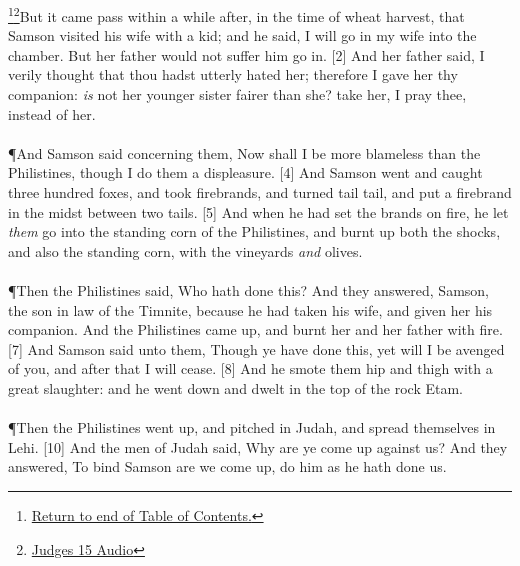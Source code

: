 \footnote{\textcolor[rgb]{0.00,0.25,0.00}{\hyperlink{JudgesTOC}{Return to end of Table of Contents.}}}\footnote{\href{https://audiobible.com/bible/judges_15.html}{\textcolor[cmyk]{0.99998,1,0,0}{Judges 15 Audio}}}\textcolor[cmyk]{0.99998,1,0,0}{But it came  pass within a while after, in the time of wheat harvest, that Samson visited his wife with a kid; and he said, I will go in  my wife into the chamber. But her father would not suffer him  go in.}
[2] \textcolor[cmyk]{0.99998,1,0,0}{And her father said, I verily thought that thou hadst utterly hated her; therefore I gave her  thy companion: \emph{is} not her younger sister fairer than she? take her, I pray thee, instead of her.}\\
\\
\P \textcolor[cmyk]{0.99998,1,0,0}{And Samson said concerning them, Now shall I be more blameless than the Philistines, though I do them a displeasure.}
[4] \textcolor[cmyk]{0.99998,1,0,0}{And Samson went and caught three hundred foxes, and took firebrands, and turned tail  tail, and put a firebrand in the midst between two tails.}
[5] \textcolor[cmyk]{0.99998,1,0,0}{And when he had set the brands on fire, he let \emph{them} go into the standing corn of the Philistines, and burnt up both the shocks, and also the standing corn, with the vineyards \emph{and} olives.}\\
\\
\P \textcolor[cmyk]{0.99998,1,0,0}{Then the Philistines said, Who hath done this? And they answered, Samson, the son in law of the Timnite, because he had taken his wife, and given her  his companion. And the Philistines came up, and burnt her and her father with fire.}
[7] \textcolor[cmyk]{0.99998,1,0,0}{And Samson said unto them, Though ye have done this, yet will I be avenged of you, and after that I will cease.}
[8] \textcolor[cmyk]{0.99998,1,0,0}{And he smote them hip and thigh with a great slaughter: and he went down and dwelt in the top of the rock Etam.}\\
\\
\P \textcolor[cmyk]{0.99998,1,0,0}{Then the Philistines went up, and pitched in Judah, and spread themselves in Lehi.}
[10] \textcolor[cmyk]{0.99998,1,0,0}{And the men of Judah said, Why are ye come up against us? And they answered, To bind Samson are we come up,  do  him as he hath done  us.}
